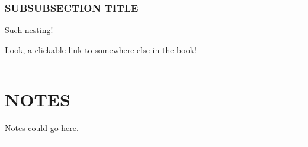 \documentclass[
]{book}
\begin{document}
\hypertarget{subsubsection-title-1}{%
\subsection*{SUBSUBSECTION TITLE}\label{subsubsection-title-1}}


Such nesting!

Look, a \protect\hyperlink{picturetemplate}{clickable link} to somewhere else in the book!

\begin{center}\rule{0.5\linewidth}{0.5pt}\end{center}

\hypertarget{notes-1}{%
\chapter*{NOTES}\label{notes-1}}


Notes could go here.

\begin{center}\rule{0.5\linewidth}{0.5pt}\end{center}
\end{document}
